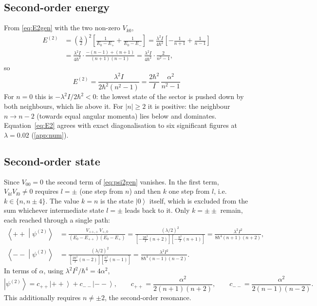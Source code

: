 \documentclass[preprint,12pt]{elsarticle}
\newcommand{\ket}[1]{\left|#1\right\rangle}
\newcommand{\braket}[2]{\left\langle#1\middle|#2\right\rangle}
\begin{document}
\subsection{Second-order energy}

From \eqref{eq:E2gen} with the two non-zero $V_{k0}$,
\begin{align}
E^{(2)}&=\left(\frac{\lambda}{2}\right)^{2}\left[\frac{1}{E_{0}-E_{+}}
+\frac{1}{E_{0}-E_{-}}\right]
=\frac{\lambda^{2}I}{4\hbar^{2}}\left[-\frac{1}{n+1}+\frac{1}{n-1}\right]
\nonumber\\
&=\frac{\lambda^{2}I}{4\hbar^{2}}\cdot\frac{-(n-1)+(n+1)}{(n+1)(n-1)}
=\frac{\lambda^{2}I}{4\hbar^{2}}\cdot\frac{2}{n^{2}-1},
\end{align}
so
\begin{equation}
\boxed{\;E^{(2)}=\frac{\lambda^{2}I}{2\hbar^{2}\left(n^{2}-1\right)}
=\frac{2\hbar^{2}}{I}\,\frac{\alpha^{2}}{n^{2}-1}\;}
\label{eq:E2}
\end{equation}
For $n=0$ this is $-\lambda^{2}I/2\hbar^{2}<0$: the lowest state of the sector
is pushed down by both neighbours, which lie above it. For $|n|\ge2$ it is
positive: the neighbour $n\to n-2$ (towards equal angular momenta) lies below
and dominates. Equation~\eqref{eq:E2} agrees with exact diagonalisation to six
significant figures at $\lambda=0.02$ (\ref{app:num}).

\subsection{Second-order state}

Since $V_{00}=0$ the second term of \eqref{eq:psi2gen} vanishes. In the first
term, $V_{kl}V_{l0}\neq0$ requires $l=\pm$ (one step from $n$) and then $k$ one
step from $l$, i.e.\ $k\in\{n,n\pm4\}$. The value $k=n$ is the state $\ket0$ itself, which is
excluded from the sum whichever intermediate state $l=\pm$ leads back to it.
Only $k={\pm}{\pm}$ remain, each reached through a single path:
\begin{align}
\braket{{+}{+}}{\psi^{(2)}}
&=\frac{V_{++,+}\,V_{+,0}}{(E_{0}-E_{++})(E_{0}-E_{+})}
=\frac{(\lambda/2)^{2}}{\left[-\frac{2\hbar^{2}}{I}(n+2)\right]
\left[-\frac{\hbar^{2}}{I}(n+1)\right]}
=\frac{\lambda^{2}I^{2}}{8\hbar^{4}(n+1)(n+2)},\\[4pt]
\braket{{-}{-}}{\psi^{(2)}}
&=\frac{(\lambda/2)^{2}}{\left[\frac{2\hbar^{2}}{I}(n-2)\right]
\left[\frac{\hbar^{2}}{I}(n-1)\right]}
=\frac{\lambda^{2}I^{2}}{8\hbar^{4}(n-1)(n-2)} .
\end{align}
In terms of $\alpha$, using $\lambda^{2}I^{2}/\hbar^{4}=4\alpha^{2}$,
\begin{equation}
\ket{\psi^{(2)}}=c_{++}\ket{{+}{+}}+c_{--}\ket{{-}{-}},\qquad
c_{++}=\frac{\alpha^{2}}{2(n+1)(n+2)},\qquad
c_{--}=\frac{\alpha^{2}}{2(n-1)(n-2)} .
\label{eq:second}
\end{equation}
This additionally requires $n\neq\pm2$, the second-order resonance.
\end{document}
